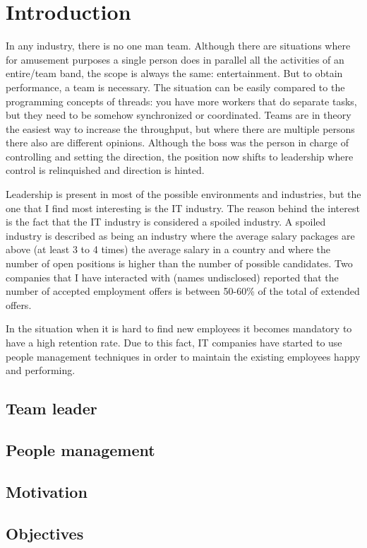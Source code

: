 \chapter{Introduction}
\label{chapter:intro}
In any industry, there is no one man team. Although there are situations where for amusement purposes a single person does in parallel all the activities of an entire/team band, the scope is always the same: entertainment. But to obtain performance, a team is necessary. The situation can be easily compared to the programming concepts of threads: you have more workers that do separate tasks, but they need to be somehow synchronized or coordinated. Teams are in theory the easiest way to increase the throughput, but where there are multiple persons there also are different opinions. Although the boss was the person in charge of controlling and setting the direction, the position now shifts to leadership where control is relinquished and direction is hinted.

Leadership is present in most of the possible environments and industries, but the one that I find most interesting is the IT industry. The reason behind the interest is the fact that the IT industry is considered a spoiled industry. A spoiled industry is described as being an industry where the average salary packages are above (at least 3 to 4 times) the average salary in a country and where the number of open positions is higher than the number of possible candidates. Two companies that I have interacted with (names undisclosed) reported that the number of accepted employment offers is between 50-60\% of the total of extended offers. 

In the situation when it is hard to find new employees it becomes mandatory to have a high retention rate. Due to this fact, IT companies have started to use people management techniques in order to maintain the existing employees happy and performing.

\section{Team leader}
\label{sec:tl}
\cite{abur-tl}
\section{People management}
\label{sec:proj-scope}
\cite{abur-pm}
\section{Motivation}
\label{sec:motivation}

\section{Objectives}
\label{sec:Objectives}
